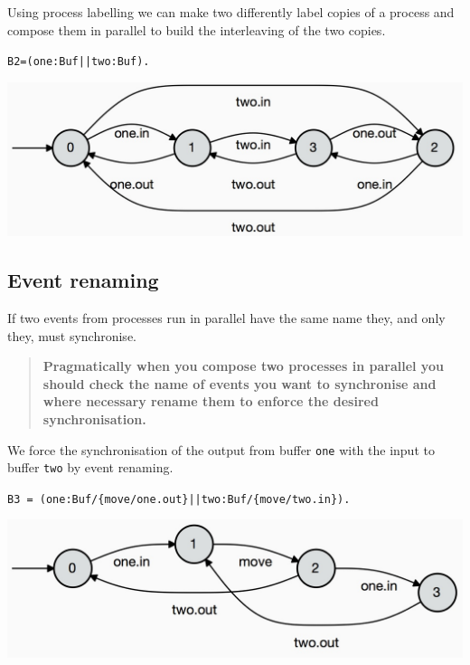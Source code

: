 \documentclass[]{article}
\begin{document}
Using process labelling we can make two differently label copies of a process and compose them in parallel to build the interleaving of the two copies.


\noindent\begin{center}\verb$B2=(one:Buf||two:Buf).$\end{center}
  
\noindent\begin{center} \includegraphics[scale=0.15]{B2.jpg} \end{center}


\subsection{Event renaming}
If two events from processes run in parallel have the same name they, and only they,  must synchronise.
\begin{quote}
{\bf Pragmatically when you compose two processes in parallel you should check the name of events   you want to   synchronise and where necessary rename them to enforce the desired synchronisation.}
\end{quote}


We force the synchronisation of the output from buffer \verb$one$ with the input to buffer \verb$two$ by event renaming.  

  
\noindent\begin{center}\verb$B3 = (one:Buf/{move/one.out}||two:Buf/{move/two.in}).$\end{center}
  
\noindent\begin{center} \includegraphics[scale=0.15]{B3.jpg} \end{center} 
\end{document}
